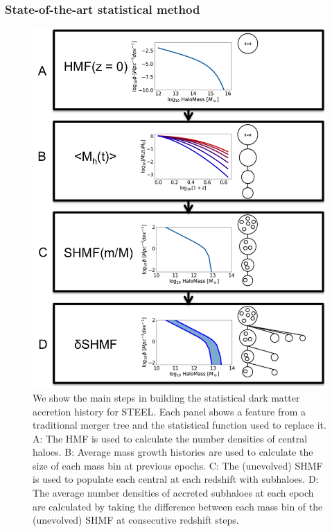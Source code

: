 \subsubsection{State-of-the-art statistical method}
\begin{figure}[h!]
    \centering
    \includegraphics[width = \linewidth]{Figures/Chapter2/StatDM.png}
    \caption{We show the main steps in building the statistical dark matter accretion history for STEEL. Each panel shows a feature from a traditional merger tree and the statistical function used to replace it. A: The HMF is used to calculate the number densities of central haloes. B: Average mass growth histories are used to calculate the size of each mass bin at previous epochs. C: The (unevolved) SHMF is used to populate each central at each redshift with subhaloes. D: The average number densities of accreted subhaloes at each epoch are calculated by taking the difference between each mass bin of the (unevolved) SHMF at consecutive redshift steps.}
    \label{fig:StatDM}
\end{figure}

